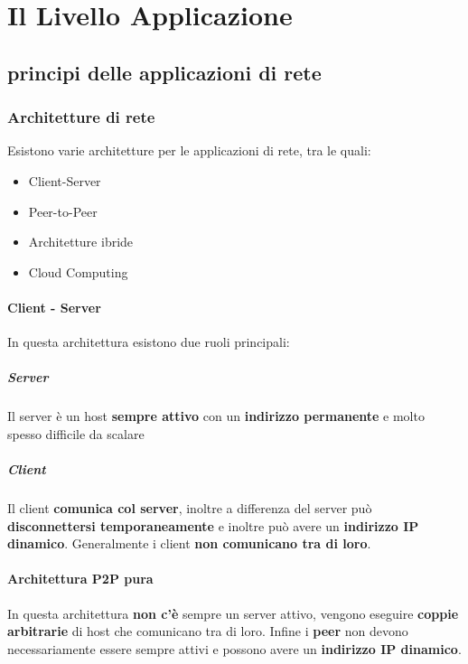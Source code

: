 \chapter{Il Livello Applicazione}
\thispagestyle{chapterInit}
\section{principi delle applicazioni di rete}
    \subsection{Architetture di rete}
        Esistono varie architetture per le applicazioni di rete, tra le quali:
        \begin{itemize}
            \item Client-Server
            \item Peer-to-Peer
            \item Architetture ibride
            \item Cloud Computing 
        \end{itemize}
        \subsubsection{Client - Server}
        \label{subsubsec:clientServer}
            In questa architettura esistono due ruoli principali:
            \paragraph{Server} Il server è un host \textbf{sempre attivo} con un \textbf{indirizzo permanente} e molto spesso difficile da scalare
            \paragraph{Client} Il client \textbf{comunica col server}, inoltre a differenza del server può \textbf{disconnettersi temporaneamente} e inoltre può avere un \textbf{indirizzo IP dinamico}. Generalmente i client \textbf{non comunicano tra di loro}.
        \subsubsection[Architettura P2P pura]{Architettura \Acrshort*{P2P} pura}
            In questa architettura \textbf{non c'è} sempre un server attivo, vengono eseguire \textbf{coppie arbitrarie} di host che comunicano tra di loro. Infine i \textbf{peer} non devono necessariamente essere sempre attivi e possono avere un \textbf{indirizzo IP dinamico}.

